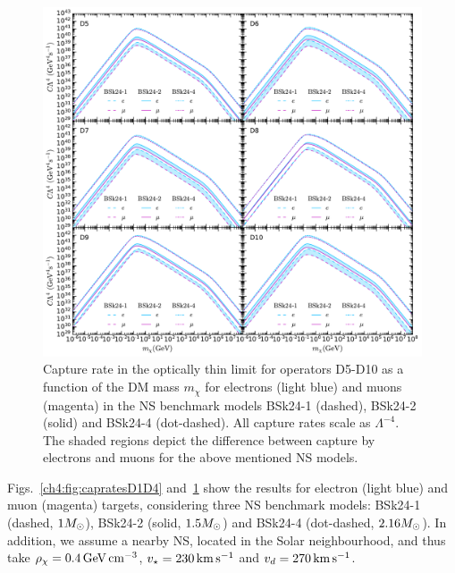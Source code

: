      \begin{figure}[t!bp] 
    \centering
    \includegraphics[width=\textwidth]{capture_2/D5_D10_C_mDM_lept.pdf}
    \caption{Capture rate in the optically thin limit for operators D5-D10 as a function of the DM mass $m_\chi$ for electrons (light blue) and muons (magenta) in the NS benchmark models BSk24-1 (dashed), BSk24-2 (solid) and BSk24-4 (dot-dashed). All capture rates scale as $\Lambda^{-4}$. The shaded regions depict the difference between capture by electrons and muons for the above mentioned NS models. 
    }
    \label{ch4:fig:capratesD5D10}
    \end{figure}

    

Figs.~\ref{ch4:fig:capratesD1D4} and~\ref{ch4:fig:capratesD5D10} show the results for electron (light blue) and muon (magenta) targets, considering three NS benchmark models: BSk24-1 (dashed, $1M_\odot$), BSk24-2 (solid, $1.5M_\odot$) and BSk24-4 (dot-dashed, $2.16M_\odot$). In addition, we assume a nearby NS, located in the Solar neighbourhood, and thus take $\rho_\chi=0.4{\rm \,GeV}{\rm \,cm}^{-3}$, $v_\star=230{\rm \,km}{\rm \,s}^{-1}$ and $v_d=270{\rm \,km}{\rm \,s}^{-1}$.  


